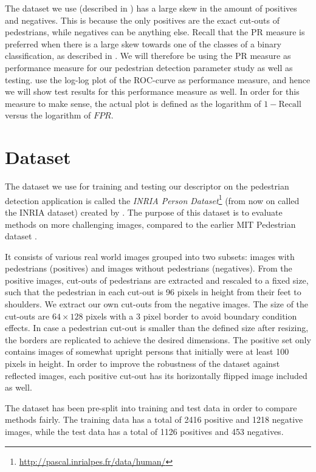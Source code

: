 \documentclass[thesis.tex]{subfiles}
\newcommand\FPR{\mathit{FPR}}
\begin{document}
The dataset we use (described in ) has a large skew in the amount of positives and negatives. This is because the only positives are the exact cut-outs of pedestrians, while negatives can be anything else.
Recall that the PR measure is preferred when there is a large skew towards one of the classes of a binary classification, as described in . We will therefore be using the PR measure as performance measure for our pedestrian detection parameter study as well as testing.  use the log-log plot of the ROC-curve as performance measure, and hence we will show test results for this performance measure as well. In order for this measure to make sense, the actual plot is defined as the logarithm of $1-\text{Recall}$ versus the logarithm of $\FPR$.
%
\section{Dataset}
\label{sec:odDataset}
%
The dataset we use for training and testing our descriptor on the pedestrian detection application is called the \emph{INRIA Person Dataset}\footnote{\url{http://pascal.inrialpes.fr/data/human/}} (from now on called the INRIA dataset) created by \citet{dalal2005histograms}. The purpose of this dataset is to evaluate methods on more challenging images, compared to the earlier MIT Pedestrian dataset \cite{papageorgiou2000trainable}.

It consists of various real world images grouped into two subsets: images with pedestrians (positives) and images without pedestrians (negatives). From the positive images, cut-outs of pedestrians are extracted and rescaled to a fixed size, such that the pedestrian in each cut-out is 96 pixels in height from their feet to shoulders. We extract our own cut-outs from the negative images. The size of the cut-outs are $64 \times 128$ pixels with a 3 pixel border to avoid boundary condition effects. In case a pedestrian cut-out is smaller than the defined size after resizing, the borders are replicated to achieve the desired dimensions.
The positive set only contains images of somewhat upright persons that initially were at least 100 pixels in height. In order to improve the robustness of the dataset against reflected images, each positive cut-out has its horizontally flipped image included as well.

The dataset has been pre-split into training and test data in order to compare methods fairly. The training data has a total of 2416 positive and 1218 negative images, while the test data has a total of 1126 positives and 453 negatives.
\end{document}
